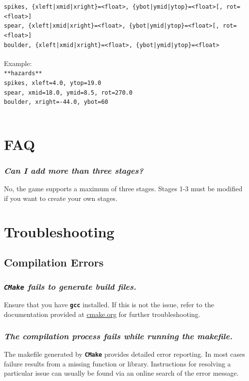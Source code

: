 \documentclass[12pt, titlepage]{article}
\begin{document}
\noindent ${}$\qquad \texttt{spikes, \{xleft|xmid|xright\}=<float>, \{ybot|ymid|ytop\}=<float>[, rot=<float>]}\\
${}$\qquad \texttt{spear, \{xleft|xmid|xright\}=<float>, \{ybot|ymid|ytop\}=<float>[, rot=<float>]}\\
${}$\qquad \texttt{boulder, \{xleft|xmid|xright\}=<float>, \{ybot|ymid|ytop\}=<float>}\\\\

\noindent Example:\\

\noindent ${}$\qquad \texttt{**hazards**}\\
${}$\qquad \texttt{spikes, xleft=4.0, ytop=19.0}\\
${}$\qquad \texttt{spear, xmid=18.0, ymid=8.5, rot=270.0}\\
${}$\qquad \texttt{boulder, xright=-44.0, ybot=60}\\\\


\section{FAQ}


\label{sec:faq}

\subsubsection{\emph{Can I add more than three stages?}}
\noindent No, the game supports a maximum of three stages.  Stages 1-3 must be modified if you want to create your own stages.

\section{Troubleshooting}
\label{sec:trouble}
\subsection{Compilation Errors}
\subsubsection{\emph{\texttt{CMake} fails to generate build files.}}
\noindent Ensure that you have \texttt{\bf gcc} installed.  If this is not the issue, refer to the documentation provided at \href{http://www.cmake.org}{cmake.org} for further troubleshooting.

\subsubsection{\emph{The compilation process fails while running the makefile.}}
\noindent The makefile generated by \texttt{\bf CMake} provides detailed error reporting.  In most cases failure results from a missing function or library.  Instructions for resolving a particular issue can usually be found via an online search of the error message.
\end{document}
